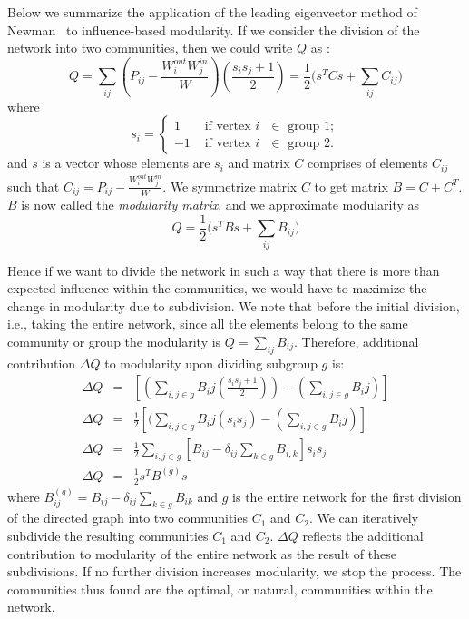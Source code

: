 \documentclass{sig-alternate}
\begin{document}





\appendix{}
Below we summarize the application of the leading eigenvector method of Newman~\cite{Newman206} to influence-based modularity. If we consider the division of the network into two communities, then we could write $Q$ as :
 \begin{equation}
\label{eq: mod16}
Q=\sum_{ij} {(P_{ij} - \frac { {W_{i}^{out}} {W_{j}^{in}}}{W})(\frac{s_{i}s_{j}+1}{2})}= \frac {1}{2} \big(s^{T}Cs +\sum_{ij}C_{ij}\big)
\end{equation}
where \\
\[
s_i = \left \{ \begin {array} {ll}
1 & \mbox{ if vertex $i$  $\in$ group 1} ; \\
-1 & \mbox{ if vertex $i$  $\in$ group 2}.
\end{array}
\right. \]
and $s$ is a vector whose elements are $s_i$ and matrix $C$ comprises of elements $C_{ij}$ such that
$C_{ij} = P_{ij} - \frac { {W_{i}^{out}} {W_{j}^{in}}}{W}$.
We symmetrize matrix $C$ to get matrix $B = C+C^{T}$. $B$ is now called the \emph {modularity matrix}, and we approximate modularity as
\begin{equation}
\label{eq: mod17}
Q=\frac{1}{2} \big( s^{T}Bs +\sum_{ij} B_{ij} \big)
\end{equation}

Hence if we want to divide the network in such a way that there is more than expected influence within the communities, we would have to maximize the change in modularity due to  subdivision. We note that before the initial division, i.e., taking the entire network,  since  all the elements belong to the same community or group the modularity is $Q=\sum_{ij} B_{ij}$.
Therefore, additional contribution $\Delta Q$ to modularity upon dividing subgroup  $g$ is:
\begin{eqnarray}
\label{eq: mod19}
\Delta Q &=& [( \sum_{i,j \in g} {B_ij (\frac{s_{i}s_{j} + 1}{2})})-( \sum_{i,j \in g} {B_ij })] \\
\Delta Q &=& \frac{1}{2}[( \sum_{i,j \in g} {B_ij (s_{i}s_{j})-( \sum_{i,j \in g} {B_ij })}] \\
\Delta Q &=&  \frac{1}{2} \sum_{i,j \in g}[ B_{ij}- \delta_{ij} \sum_{k \in g}B_{i,k} ]s_{i}s_{j}\\
\Delta Q &=&  \frac{1}{2} s^{T}B^{(g)}s
\end{eqnarray}
where
$B_{ij}^{(g)}= B_{ij}- \delta_{ij} \sum_{k \in g} B_{ik}$
and $ g $ is the entire network  for the first division of the directed graph into two communities $C_1$  and $C_2$. We can iteratively subdivide the resulting communities $C_1$ and $C_2$. $\Delta Q$  reflects the additional contribution to modularity of the entire network as the result of  these subdivisions. If no  further division increases modularity,  we stop the process. The communities thus found are the optimal, or natural, communities within the network.
\end{document}
